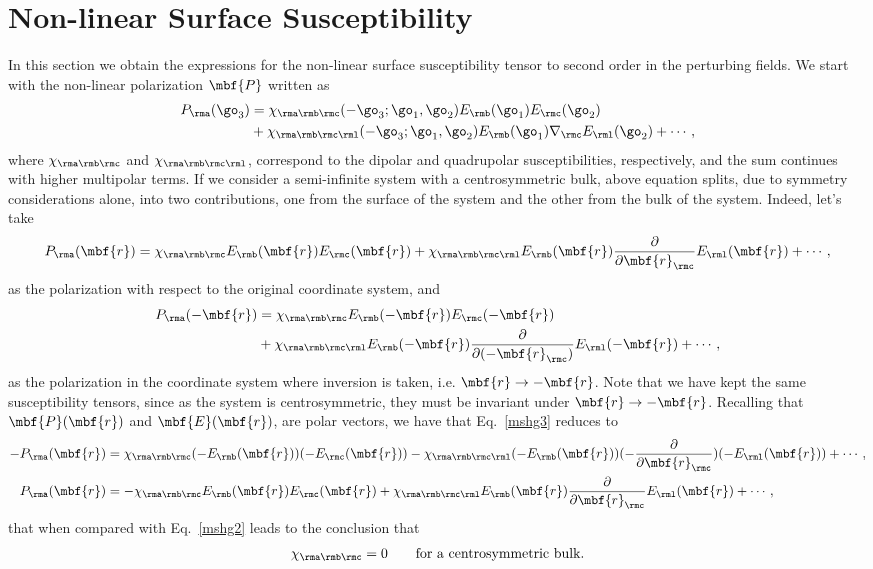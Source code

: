 \documentclass[floatfix,prb,aps,superscriptaddress,11pt,preprint,letterpaper]{revtex4}
\begin{document}
\section{Non-linear Surface Susceptibility}\label{nonchi}

In this section we obtain the expressions for the non-linear
surface susceptibility tensor to second order in the perturbing fields.
We start with the 
non-linear polarization $\mbf{P}$ written as
\begin{align}\label{mshg}
P_{\rma}(\go_3)&=\chi_{\rma\rmb\rmc}(-\go_3;\go_1,\go_2)
E_{\rmb}(\go_1)
E_{\rmc}(\go_2)
\nonumber \\
&+
\chi_{\rma\rmb\rmc\rml}(-\go_3;\go_1,\go_2)
E_{\rmb}(\go_1)\nabla_{\rmc} E_{\rml}(\go_2)
+\cdots,
\end{align}
where $\chi_{\rma\rmb\rmc}$ and $\chi_{\rma\rmb\rmc\rml}$,
correspond to the dipolar and quadrupolar susceptibilities,
respectively,
and the sum continues
with higher multipolar terms.
If we consider a semi-infinite system with a centrosymmetric bulk,
above equation splits, due to symmetry considerations alone, into two
contributions, one from the surface of the system and the other from
the bulk of the system. Indeed, let's take
\begin{equation}\label{mshg2}
P_{\rma}(\mbf{r})=\chi_{\rma\rmb\rmc}E_{\rmb}(\mbf{r})E_{\rmc}(\mbf{r})
+
\chi_{\rma\rmb\rmc\rml}E_{\rmb}(\mbf{r})\frac{\partial}{\partial
  \mbf{r}_{\rmc}} E_{\rml}(\mbf{r}) 
+\cdots,
\end{equation}
as the polarization with respect to the original coordinate system, and 
\begin{align}\label{mshg3}
P_{\rma}(-\mbf{r})&=\chi_{\rma\rmb\rmc}E_{\rmb}(-\mbf{r})E_{\rmc}(-\mbf{r})
\nonumber \\
&+
\chi_{\rma\rmb\rmc\rml}E_{\rmb}(-\mbf{r})\frac{\partial}{\partial(-
  \mbf{r}_{\rmc})} E_{\rml}(-\mbf{r}) 
+\cdots, 
\end{align}
as the polarization in the coordinate system where inversion is taken,
i.e. $\mbf{r} \to -\mbf{r}$. 
Note that we have kept the same susceptibility tensors, since as the
system is centrosymmetric, they must be invariant under $\mbf{r} \to
-\mbf{r}$. 
Recalling that $\mbf{P}(\mbf{r})$ and
$\mbf{E}(\mbf{r})$, are polar vectors,\cite{jackson_classical_1975} we have that
Eq.~\eqref{mshg3} reduces to
\begin{align}\label{mshg4}
-P_{\rma}(\mbf{r})&=\chi_{\rma\rmb\rmc}(-E_{\rmb}(\mbf{r}))(-E_{\rmc}(\mbf{r}))
-
\chi_{\rma\rmb\rmc\rml}(-E_{\rmb}(\mbf{r}))(-\frac{\partial}{\partial\mbf{r}_{\rmc}})(-
E_{\rml}(\mbf{r})) 
+\cdots,
\nonumber \\
P_{\rma}(\mbf{r})&=-\chi_{\rma\rmb\rmc}E_{\rmb}(\mbf{r})E_{\rmc}(\mbf{r})
+
\chi_{\rma\rmb\rmc\rml}E_{\rmb}(\mbf{r})\frac{\partial}{\partial\mbf{r}_{\rmc}}
E_{\rml}(\mbf{r}) 
+\cdots,
\end{align}
that when compared with Eq.~\eqref{mshg2}
leads to the conclusion that
\begin{equation}\label{sshg}
\chi_{\rma\rmb\rmc}=0 \quad\quad\mbox{for a centrosymmetric bulk}.
\end{equation}
\end{document}
